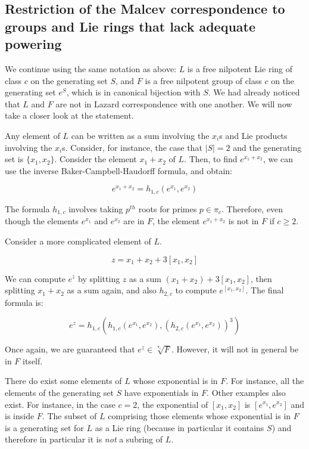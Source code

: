 \subsection{Restriction of the Malcev correspondence to groups and Lie rings that lack adequate powering}

We continue using the same notation as above: $L$ is a free nilpotent
Lie ring of class $c$ on the generating set $S$, and $F$ is a free
nilpotent group of class $c$ on the generating set $e^S$, which is in
canonical bijection with $S$. We had already noticed that $L$ and $F$
are not in Lazard correspondence with one another. We will now take a
closer look at the statement.

Any element of $L$ can be written as a sum involving the $x_i$s and
Lie products involving the $x_i$s. Consider, for instance, the case
that $|S| = 2$ and the generating set is $\{ x_1, x_2 \}$. Consider
the element $x_1 + x_2$ of $L$. Then, to find $e^{x_1 + x_2}$, we can
use the inverse Baker-Campbell-Haudorff formula, and obtain:

$$e^{x_1 + x_2} = h_{1,c}(e^{x_1},e^{x_2})$$

The formula $h_{1,c}$ involves taking $p^{th}$ roots for primes $p \in
\pi_c$. Therefore, even though the elements $e^{x_1}$ and $e^{x_2}$ are in
$F$, the element $e^{x_1 + x_2}$ is not in $F$ if $c \ge 2$.

Consider a more complicated element of $L$.

$$z = x_1 + x_2 + 3[x_1,x_2]$$

We can compute $e^z$ by splitting $z$ as a sum $(x_1 + x_2) +
3[x_1,x_2]$, then splitting $x_1 + x_2$ as a sum again, and also
$h_{2,c}$ to compute $e^{[x_1,x_2]}$. The final formula is:

$$e^z = h_{1,c}(h_{1,c}(e^{x_1},e^{x_2}),(h_{2,c}(e^{x_1},e^{x_2}))^3)$$

Once again, we are guaranteed that $e^z \in \sqrt[\pi_c]{F}$. However,
it will not in general be in $F$ itself.

There do exist some elements of $L$ whose exponential is in $F$. For
instance, all the elements of the generating set $S$ have exponentials
in $F$. Other examples also exist. For instance, in the case $c = 2$,
the exponential of $[x_1,x_2]$ is $[e^{x_1},e^{x_2}]$ and is inside
$F$. The subset of $L$ comprising those elements whose exponential is
in $F$ is a generating set for $L$ as a Lie ring (because in
particular it contains $S$) and therefore in particular it is {\em
  not} a subring of $L$.

